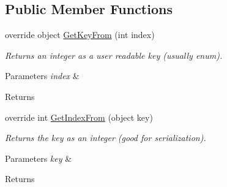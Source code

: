 \subsection*{Public Member Functions}
\begin{DoxyCompactItemize}
\item 
\hypertarget{class_skyrates_1_1_ship_1_1_ship_component_list_a203816146c8f0f45891760cc44fd9734}{override object \hyperlink{class_skyrates_1_1_ship_1_1_ship_component_list_a203816146c8f0f45891760cc44fd9734}{Get\-Key\-From} (int index)}\label{class_skyrates_1_1_ship_1_1_ship_component_list_a203816146c8f0f45891760cc44fd9734}

\begin{DoxyCompactList}\small\item\em Returns an integer as a user readable key (usually enum). 


\begin{DoxyParams}{Parameters}
{\em index} & \\
\hline
\end{DoxyParams}
\begin{DoxyReturn}{Returns}

\end{DoxyReturn}
 \end{DoxyCompactList}\item 
\hypertarget{class_skyrates_1_1_ship_1_1_ship_component_list_a500cd86160607f8f5ee413b502f7b2e2}{override int \hyperlink{class_skyrates_1_1_ship_1_1_ship_component_list_a500cd86160607f8f5ee413b502f7b2e2}{Get\-Index\-From} (object key)}\label{class_skyrates_1_1_ship_1_1_ship_component_list_a500cd86160607f8f5ee413b502f7b2e2}

\begin{DoxyCompactList}\small\item\em Returns the key as an integer (good for serialization). 


\begin{DoxyParams}{Parameters}
{\em key} & \\
\hline
\end{DoxyParams}
\begin{DoxyReturn}{Returns}


\end{DoxyReturn}
\end{DoxyCompactList}
\end{DoxyCompactItemize}
